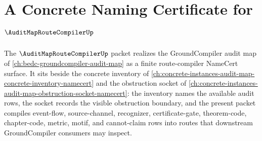 \chapter{A Concrete Naming Certificate for $\AuditMapRouteCompilerUp$}
\label{ch:concrete-instances-audit-map-route-compiler-namecert}

The $\AuditMapRouteCompilerUp$ packet realizes the GroundCompiler audit map of \autoref{ch:bedc-groundcompiler-audit-map} as a finite route-compiler NameCert surface. It sits beside the concrete inventory of \autoref{ch:concrete-instances-audit-map-concrete-inventory-namecert} and the obstruction socket of \autoref{ch:concrete-instances-audit-map-obstruction-socket-namecert}: the inventory names the available audit rows, the socket records the visible obstruction boundary, and the present packet compiles event-flow, source-channel, recognizer, certificate-gate, theorem-code, chapter-code, metric, motif, and cannot-claim rows into routes that downstream GroundCompiler consumers may inspect.

